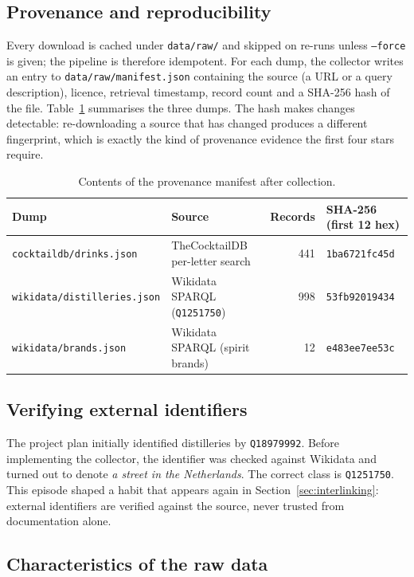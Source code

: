 \subsection{Provenance and reproducibility}

Every download is cached under \texttt{data/raw/} and skipped on re-runs unless
\texttt{--force} is given; the pipeline is therefore idempotent. For each dump,
the collector writes an entry to \texttt{data/raw/manifest.json} containing the
source (a URL or a query description), licence, retrieval timestamp, record
count and a SHA-256 hash of the file. Table~\ref{tab:manifest} summarises the three dumps. The hash makes
changes detectable: re-downloading a source that has changed produces a
different fingerprint, which is exactly the kind of provenance evidence the
first four stars require.

\begin{table}[h]
  \centering
  \small
  \begin{tabular}{@{}llrl@{}}
    \toprule
    Dump & Source & Records & SHA-256 (first 12 hex) \\
    \midrule
    \texttt{cocktaildb/drinks.json} & TheCocktailDB per-letter search & 441 & \texttt{1ba6721fc45d} \\
    \texttt{wikidata/distilleries.json} & Wikidata SPARQL (\texttt{Q1251750}) & 998 & \texttt{53fb92019434} \\
    \texttt{wikidata/brands.json} & Wikidata SPARQL (spirit brands) & 12 & \texttt{e483ee7ee53c} \\
    \bottomrule
  \end{tabular}
  \caption{Contents of the provenance manifest after collection.}
  \label{tab:manifest}
\end{table}

\subsection{Verifying external identifiers}

The project plan initially identified distilleries by \texttt{Q18979992}. Before
implementing the collector, the identifier was checked against Wikidata and
turned out to denote \emph{a street in the Netherlands}. The correct class is
\texttt{Q1251750}. This episode shaped a habit that appears again in
Section~\ref{sec:interlinking}: external identifiers are verified against the source, never trusted
from documentation alone.

\subsection{Characteristics of the raw data}


